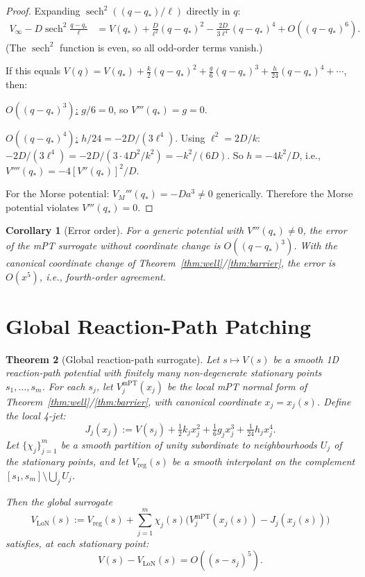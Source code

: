 \documentclass[12pt]{article}
\theoremstyle{plain}
\newtheorem{theorem}{Theorem}[section]
\newtheorem{corollary}[theorem]{Corollary}
\theoremstyle{definition}
\numberwithin{equation}{section}
\newcommand{\LoN}{\mathrm{LoN}}
\DeclareMathOperator{\sech}{sech}
\begin{document}
\begin{proof}
Expanding $\sech^2((q-q_*)/\ell)$ directly in $q$:
\begin{align}
V_\infty-D\sech^2\frac{q-q_*}{\ell}
&= V(q_*)+\frac{D}{\ell^2}(q-q_*)^2
-\frac{2D}{3\ell^4}(q-q_*)^4+O((q-q_*)^6).
\end{align}
(The $\sech^2$ function is even, so all odd-order terms vanish.)

If this equals $V(q)=V(q_*)+\frac{k}{2}(q-q_*)^2
+\frac{g}{6}(q-q_*)^3+\frac{h}{24}(q-q_*)^4+\cdots$,
then:

\underline{$O((q-q_*)^3)$:} $g/6=0$, so $V'''(q_*)=g=0$.

\underline{$O((q-q_*)^4)$:} $h/24=-2D/(3\ell^4)$.
Using $\ell^2=2D/k$: $-2D/(3\ell^4)=-2D/(3\cdot4D^2/k^2)
=-k^2/(6D)$.
So $h=-4k^2/D$, i.e., $V''''(q_*)=-4[V''(q_*)]^2/D$.

For the Morse potential: $V_M'''(q_*)=-Da^3\neq 0$ generically.
Therefore the Morse potential violates $V'''(q_*)=0$.
\end{proof}

\begin{corollary}[Error order]\label{cor:error}
For a generic potential with $V'''(q_*)\neq 0$, the error of the
mPT surrogate \emph{without} coordinate change is $O((q-q_*)^3)$.
With the canonical coordinate change of
Theorem~\ref{thm:well}/\ref{thm:barrier}, the error is $O(x^5)$,
i.e., fourth-order agreement.
\end{corollary}


\section{Global Reaction-Path Patching}\label{sec:patching}

\begin{theorem}[Global reaction-path surrogate]\label{thm:patching}
Let $s\mapsto V(s)$ be a smooth 1D reaction-path potential with
finitely many non-degenerate stationary points
$s_1,\ldots,s_m$.  For each $s_j$, let $V_j^{\mathrm{mPT}}(x_j)$
be the local mPT normal form of
Theorem~\ref{thm:well}/\ref{thm:barrier}, with canonical
coordinate $x_j=x_j(s)$.  Define the local 4-jet:
\begin{equation}
J_j(x_j) := V(s_j) + \tfrac{1}{2}k_j x_j^2
+ \tfrac{1}{6}g_j x_j^3 + \tfrac{1}{24}h_j x_j^4.
\end{equation}
Let $\{\chi_j\}_{j=1}^m$ be a smooth partition of unity
subordinate to neighbourhoods $U_j$ of the stationary points,
and let $V_{\mathrm{reg}}(s)$ be a smooth interpolant on the
complement $[s_1,s_m]\setminus\bigcup_j U_j$.

Then the global surrogate
\begin{equation}\label{eq:globalLoN}
\boxed{V_{\LoN}(s) := V_{\mathrm{reg}}(s)
+ \sum_{j=1}^m \chi_j(s)\bigl(
V_j^{\mathrm{mPT}}(x_j(s)) - J_j(x_j(s))\bigr)}
\end{equation}
satisfies, at each stationary point:
\begin{equation}
\boxed{V(s) - V_{\LoN}(s) = O\!\left((s-s_j)^5\right).}
\end{equation}
\end{theorem}
\end{document}

